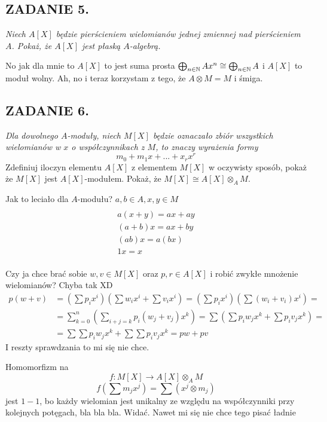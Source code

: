 \documentclass{article}
\begin{document}
\subsection*{ZADANIE 5.}
\emph{\color{pink}Niech $A[X]$ będzie pierścieniem wielomianów jednej zmiennej nad pierścieniem $A$. Pokaż, że $A[X]$ jest płaską $A$-algebrą.}
\smallskip

No jak dla mnie to $A[X]$ to jest suma prosta $\bigoplus_{n\in\mathbb{N}}Ax^n\cong \bigoplus_{n\in\mathbb{N}}A$ i $A[X]$ to moduł wolny.
Ah, no i teraz korzystam z tego, że $A\otimes M=M$ i śmiga.


\subsection*{ZADANIE 6.}
{\color{pink}\emph{Dla dowolnego $A$-moduły, niech $M[X]$ będzie oznaczało zbiór wszystkich wielomianów w $x$ o współczynnikach z $M$, to znaczy wyrażenia formy}
$$m_0+m_1x+...+x_rx^r$$
Zdefiniuj iloczyn elementu $A[X]$ z elementem $M[X]$ w oczywisty sposób, pokaż że $M[X]$ jest $A[X]$-modułem. Pokaż, że $M[X]\cong A[X]\otimes_AM$.}
\smallskip

Jak to leciało dla $A$-modułu? $a,b\in A, x,y\in M$
\begin{multline*}\\
    a(x+y)=ax+ay\\
    (a+b)x=ax+by\\
    (ab)x=a(bx)\\
    1x=x\\
\end{multline*}

Czy ja chce brać sobie $w,v\in M[X]$ oraz $p,r\in A[X]$ i robić zwykłe mnożenie wielomianów? Chyba tak XD
\begin{align*}
    p(w+v)&=\left(\sum p_ix^i\right)\left(\sum w_ix^i+\sum v_ix^i\right)=\left(\sum p_ix^i\right)\left(\sum(w_i+v_i)x^i\right)=\\
    &=\sum\limits_{k=0}^n\left(\sum\limits_{i+j=k} p_i(w_j+v_j)x^k\right)=\sum\left(\sum p_iw_jx^k+\sum p_iv_jx^k\right)=\\
    &=\sum\sum p_iw_jx^k+\sum\sum p_iv_jx^k=pw+pv
\end{align*}
I reszty sprawdzania to mi się nie chce.

Homomorfizm na
$$f:M[X]\to A[X]\otimes_AM$$
$$f(\sum m_jx^j)=\sum(x^j\otimes m_j)$$
jest $1-1$, bo każdy wielomian jest unikalny ze względu na współczynniki przy kolejnych potęgach, bla bla bla. Widać. Nawet mi się nie chce tego pisać ładnie
\end{document}
